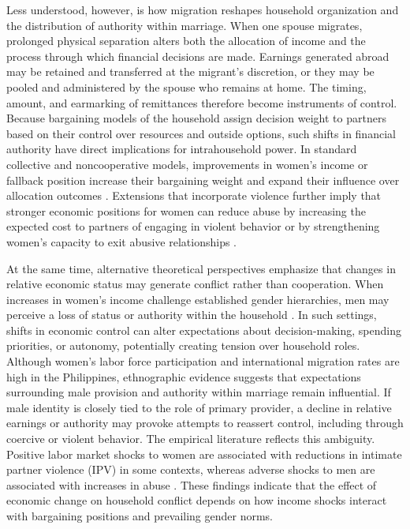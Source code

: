 \documentclass[12pt]{article}
\begin{document}
Less understood, however, is how migration reshapes household organization and the distribution of authority within marriage. When one spouse migrates, prolonged physical separation alters both the allocation of income and the process through which financial decisions are made. Earnings generated abroad may be retained and transferred at the migrant’s discretion, or they may be pooled and administered by the spouse who remains at home. The timing, amount, and earmarking of remittances therefore become instruments of control. Because bargaining models of the household assign decision weight to partners based on their control over resources and outside options, such shifts in financial authority have direct implications for intrahousehold power. In standard collective and noncooperative models, improvements in women’s income or fallback position increase their bargaining weight and expand their influence over allocation outcomes \citep{manser1980marriage, mcelroy1981nash}. Extensions that incorporate violence further imply that stronger economic positions for women can reduce abuse by increasing the expected cost to partners of engaging in violent behavior or by strengthening women’s capacity to exit abusive relationships \citep{aizer2010gender}.

At the same time, alternative theoretical perspectives emphasize that changes in relative economic status may generate conflict rather than cooperation. When increases in women’s income challenge established gender hierarchies, men may perceive a loss of status or authority within the household \citep{eswaran2011domestic, anderberg2016unemployment}. In such settings, shifts in economic control can alter expectations about decision-making, spending priorities, or autonomy, potentially creating tension over household roles. Although women's labor force participation and international migration rates are high in the Philippines, ethnographic \citep{medina2001filipino} evidence suggests that expectations surrounding male provision and authority within marriage remain influential. If male identity is closely tied to the role of primary provider, a decline in relative earnings or authority may provoke attempts to reassert control, including through coercive or violent behavior. The empirical literature reflects this ambiguity. Positive labor market shocks to women are associated with reductions in intimate partner violence (IPV) in some contexts, whereas adverse shocks to men are associated with increases in abuse \citep{aizer2010gender, autor2019work}. These findings indicate that the effect of economic change on household conflict depends on how income shocks interact with bargaining positions and prevailing gender norms.
\end{document}

